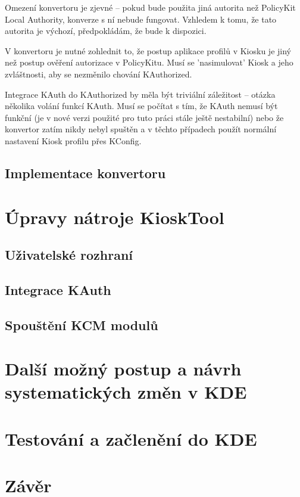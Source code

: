 Omezení konvertoru je zjevné -- pokud bude použita jiná autorita než PolicyKit
Local Authority, konverze s ní nebude fungovat. Vzhledem k tomu, že tato
autorita je výchozí, předpokládám, že bude k dispozici.

V konvertoru je nutné zohlednit to, že postup aplikace profilů v Kiosku je jiný
než postup ověření autorizace v PolicyKitu. Musí se 'nasimulovat' Kiosk a jeho
zvláštnosti, aby se nezměnilo chování KAuthorized.

Integrace KAuth do KAuthorized by měla být triviální záležitost -- otázka
několika volání funkcí KAuth. Musí se počítat s tím, že KAuth nemusí být
funkční (je v nové verzi použité pro tuto práci stále ještě nestabilní) nebo že
konvertor zatím nikdy nebyl spuštěn a v těchto případech použít normální
nastavení Kiosk profilu přes KConfig.

\section{Implementace konvertoru}


\chapter{Úpravy nátroje KioskTool}
\section{Uživatelské rozhraní}
\section{Integrace KAuth}
\section{Spouštění KCM modulů}
\chapter{Další možný postup a návrh systematických změn v KDE}
\chapter{Testování a začlenění do KDE}
\chapter{Závěr}
\cite{fitWeb}
